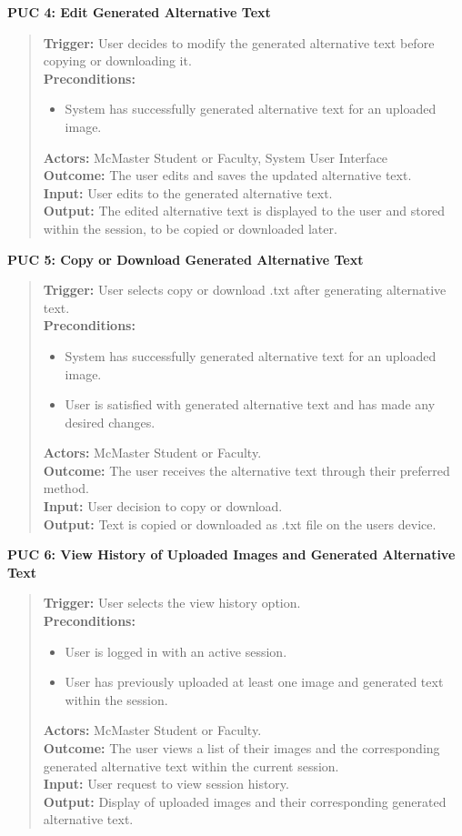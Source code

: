 \documentclass[12pt]{article}
\begin{document}
\textbf{PUC 4: Edit Generated Alternative Text}
\begin{quote}
\textbf{Trigger:} User decides to modify the generated alternative text before copying or downloading it.\\
\textbf{Preconditions:}
\begin{itemize}
  \item System has successfully generated alternative text for an uploaded image.
\end{itemize}
\textbf{Actors:} McMaster Student or Faculty, System User Interface \\
\textbf{Outcome:} The user edits and saves the updated alternative text. \\
\textbf{Input:} User edits to the generated alternative text.\\
\textbf{Output:} The edited alternative text is displayed to the user and stored within the session, to be copied or downloaded later.
\end{quote}
\textbf{PUC 5: Copy or Download Generated Alternative Text }
\begin{quote}
\textbf{Trigger:} User selects copy or download .txt after generating alternative text.\\
\textbf{Preconditions:}
\begin{itemize}
  \item System has successfully generated alternative text for an uploaded image.
  \item User is satisfied with generated alternative text and has made any desired changes. 
\end{itemize}
\textbf{Actors:} McMaster Student or Faculty. \\
\textbf{Outcome:} The user receives the alternative text through their preferred method. \\
\textbf{Input:} User decision to copy or download.\\
\textbf{Output:} Text is copied or downloaded as .txt file on the users device.
\end{quote}
\textbf{PUC 6: View History of Uploaded Images and Generated Alternative Text}
\begin{quote}
  \textbf{Trigger:} User selects the view history option.\\
  \textbf{Preconditions:}
  \begin{itemize}
    \item User is logged in with an active session.
    \item User has previously uploaded at least one image and
      generated text within the session.
  \end{itemize}
  \textbf{Actors:} McMaster Student or Faculty.\\
  \textbf{Outcome:} The user views a list of their images and the
  corresponding generated alternative text within the current session. \\
  \textbf{Input:} User request to view session history.\\
  \textbf{Output:} Display of uploaded images and their corresponding
  generated alternative text.\\
\end{quote}
\end{document}
